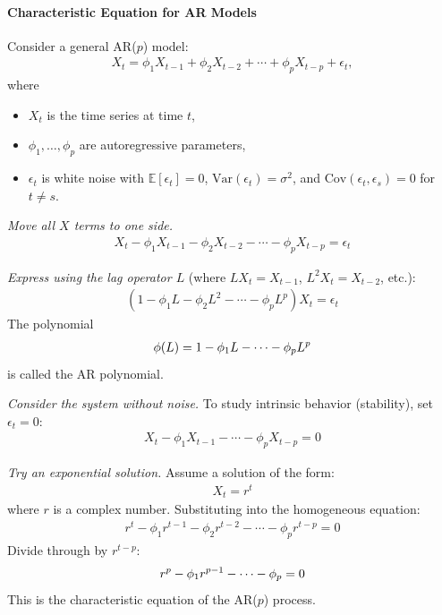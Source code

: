 \documentclass[10pt,a4paper]{article}
\begin{document}
	\paragraph{Characteristic Equation for AR Models}
	Consider a general AR($p$) model:
	\begin{align*}
	X_t = \phi_1 X_{t-1} + \phi_2 X_{t-2} + \cdots + \phi_p X_{t-p} + \epsilon_t,
	\end{align*}
	where
	\begin{itemize}
	    \item $X_t$ is the time series at time $t$,
	    \item $\phi_1, \dots, \phi_p$ are autoregressive parameters,
	    \item $\epsilon_t$ is white noise with $\mathbb{E}[\epsilon_t] = 0$, $\text{Var}(\epsilon_t) = \sigma^2$, and $\text{Cov}(\epsilon_t,\epsilon_s)=0$ for $t \neq s$.
	\end{itemize}
	
	\textit{Move all $X$ terms to one side.}
	\begin{align*}
	X_t - \phi_1 X_{t-1} - \phi_2 X_{t-2} - \cdots - \phi_p X_{t-p} = \epsilon_t
	\end{align*}
	
	\textit{Express using the lag operator $L$} (where $L X_t = X_{t-1}$, $L^2 X_t = X_{t-2}$, etc.):
	\begin{align*}
	(1 - \phi_1 L - \phi_2 L^2 - \cdots - \phi_p L^p) X_t = \epsilon_t
	\end{align*}
	The polynomial
	\begin{align*}
	\large \phi(L) = 1 - \phi_1 L - \cdots - \phi_p L^p
	\end{align*}
	is called the AR polynomial.
	
	\textit{Consider the system without noise.}  
	To study intrinsic behavior (stability), set $\epsilon_t = 0$:
	\begin{align*}
	X_t - \phi_1 X_{t-1} - \cdots - \phi_p X_{t-p} = 0
	\end{align*}
	
	\textit{Try an exponential solution.}  
	Assume a solution of the form:
	\begin{align*}
	X_t = r^t
	\end{align*}
	where $r$ is a complex number. Substituting into the homogeneous equation:
	\begin{align*}
	r^t - \phi_1 r^{t-1} - \phi_2 r^{t-2} - \cdots - \phi_p r^{t-p} = 0
	\end{align*}
	Divide through by $r^{t-p}$:
	\begin{align*}
	\large r^p - \phi_1 r^{p-1} - \cdots - \phi_p = 0
	\end{align*}
	This is the characteristic equation of the AR($p$) process.
	
\end{document}

